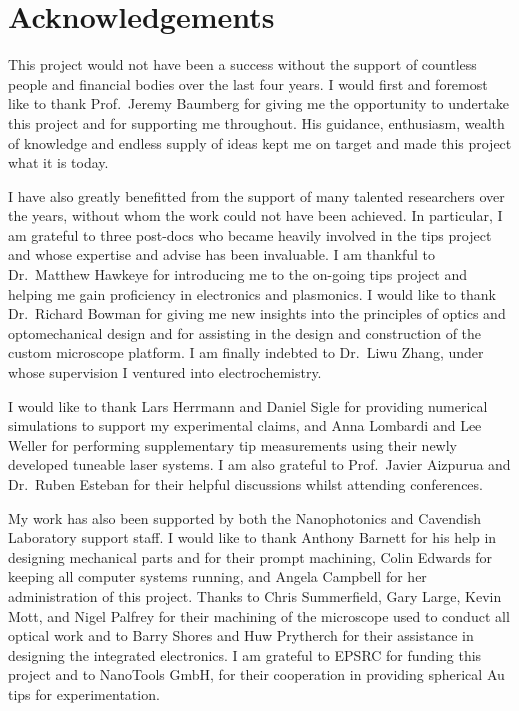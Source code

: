 \documentclass[12pt, a4paper, oneside]{book}
\begin{document}
\newpage
\section*{Acknowledgements}

This project would not have been a success without the support of countless people and financial bodies over the last four years.
I would first and foremost like to thank Prof.\ Jeremy Baumberg for giving me the opportunity to undertake this project and for supporting me throughout. His guidance, enthusiasm, wealth of knowledge and endless supply of ideas kept me on target and made this project what it is today.

I have also greatly benefitted from the support of many talented researchers over the years, without whom the work could not have been achieved. In particular, I am grateful to three post-docs who became heavily involved in the tips project and whose expertise and advise has been invaluable. I am thankful to Dr.\ Matthew Hawkeye for introducing me to the on-going tips project and helping me gain proficiency in electronics and plasmonics. I would like to thank Dr.\ Richard Bowman for giving me new insights into the principles of optics and optomechanical design and for assisting in the design and construction of the custom microscope platform. I am finally indebted to Dr.\ Liwu Zhang, under whose supervision I ventured into electrochemistry.

I would like to thank Lars Herrmann and Daniel Sigle for providing numerical simulations to support my experimental claims, and Anna Lombardi and Lee Weller for performing supplementary tip measurements using their newly developed tuneable laser systems. I am also grateful to Prof.\ Javier Aizpurua and Dr.\ Ruben Esteban for their helpful discussions whilst attending conferences.

My work has also been supported by both the Nanophotonics and Cavendish Laboratory support staff. I would like to thank Anthony Barnett for his help in designing mechanical parts and for their prompt machining, Colin Edwards for keeping all computer systems running, and Angela Campbell for her administration of this project. Thanks to Chris Summerfield, Gary Large, Kevin Mott, and Nigel Palfrey for their machining of the microscope used to conduct all optical work and to Barry Shores and Huw Prytherch for their assistance in designing the integrated electronics. I am grateful to EPSRC for funding this project and to NanoTools GmbH, for their cooperation in providing spherical Au tips for experimentation.
\end{document}
